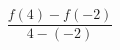 \documentclass[preview]{standalone}
\begin{document}
\begin{align*}
\dfrac{f(4) - f(-2)}{4 - (-2)}
\end{align*}
\end{document}
